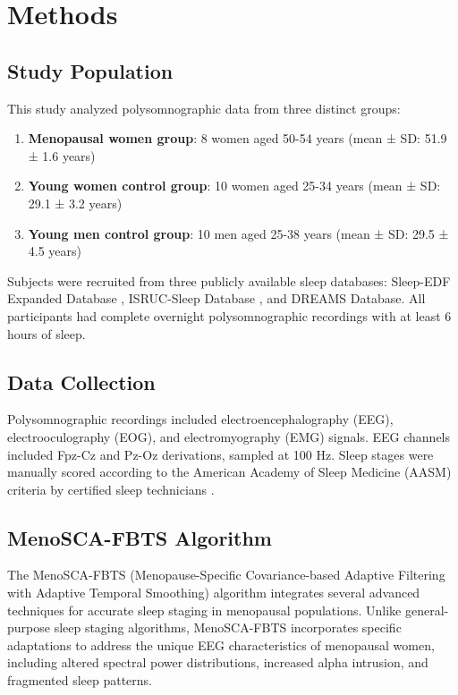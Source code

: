 \documentclass[ASNA,twocolumn]{USG}
\begin{document}
\section{Methods}\label{sec2}

\subsection{Study Population}

This study analyzed polysomnographic data from three distinct groups:

\begin{enumerate}
\item \textbf{Menopausal women group}: 8 women aged 50-54 years (mean ± SD: 51.9 ± 1.6 years)
\item \textbf{Young women control group}: 10 women aged 25-34 years (mean ± SD: 29.1 ± 3.2 years)
\item \textbf{Young men control group}: 10 men aged 25-38 years (mean ± SD: 29.5 ± 4.5 years)
\end{enumerate}

Subjects were recruited from three publicly available sleep databases: Sleep-EDF Expanded Database \cite{Goldberger2000}, ISRUC-Sleep Database \cite{Khalighi2016}, and DREAMS Database. All participants had complete overnight polysomnographic recordings with at least 6 hours of sleep.

\subsection{Data Collection}

Polysomnographic recordings included electroencephalography (EEG), electrooculography (EOG), and electromyography (EMG) signals. EEG channels included Fpz-Cz and Pz-Oz derivations, sampled at 100 Hz. Sleep stages were manually scored according to the American Academy of Sleep Medicine (AASM) criteria by certified sleep technicians \cite{Iber2007}.

\subsection{MenoSCA-FBTS Algorithm}

The MenoSCA-FBTS (Menopause-Specific Covariance-based Adaptive Filtering with Adaptive Temporal Smoothing) algorithm integrates several advanced techniques for accurate sleep staging in menopausal populations. Unlike general-purpose sleep staging algorithms, MenoSCA-FBTS incorporates specific adaptations to address the unique EEG characteristics of menopausal women, including altered spectral power distributions, increased alpha intrusion, and fragmented sleep patterns.
\end{document}
